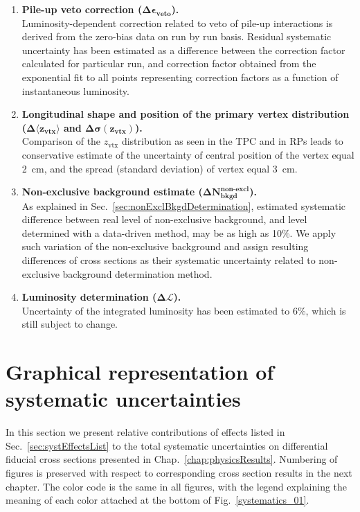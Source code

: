 \begin{enumerate}
 \item \textbf{Pile-up veto correction ($\bm{\Delta\epsilon_{\text{veto}}}$).}\\
 Luminosity-dependent correction related to veto of pile-up interactions is derived from the zero-bias data on run by run basis. Residual systematic uncertainty has been estimated as a difference between the correction factor calculated for particular run, and correction factor obtained from the exponential fit to all points representing correction factors as a function of instantaneous luminosity.
 \item \textbf{Longitudinal shape and position of the primary vertex distribution ($\bm{\Delta\langle z_{\text{vtx}}\rangle}$ and $\bm{\Delta\sigma( z_{\text{vtx}})}$).}\\
 Comparison of the $z_{\text{vtx}}$ distribution as seen in the TPC and in RPs leads to conservative estimate of the uncertainty of central position of the vertex equal 2~cm, and the spread (standard deviation) of vertex equal 3~cm.
 \item \textbf{Non-exclusive background estimate ($\bm{\Delta N_{\text{bkgd}}^{\text{non-excl}}}$).}\\
 As explained in Sec.~\ref{sec:nonExclBkgdDetermination}, estimated systematic difference between real level of non-exclusive background, and level determined with a data-driven method, may be as high as 10\%. We apply such variation of the non-exclusive background and assign resulting differences of cross sections as their systematic uncertainty related to non-exclusive background determination method.
 \item \textbf{Luminosity determination ($\bm{\Delta\mathcal{L}}$).}\\
 Uncertainty of the integrated luminosity has been estimated to 6\%, which is still subject to change.
\end{enumerate}

\section{Graphical representation of systematic uncertainties}
In this section we present relative contributions of effects listed in Sec.~\ref{sec:systEffectsList} to the total systematic uncertainties on differential fiducial cross sections presented in Chap.~\ref{chap:physicsResults}. Numbering of figures is preserved with respect to corresponding cross section results in the next chapter. The color code is the same in all figures, with the legend explaining the meaning of each color attached at the bottom of Fig.~\ref{systematics_01}.


